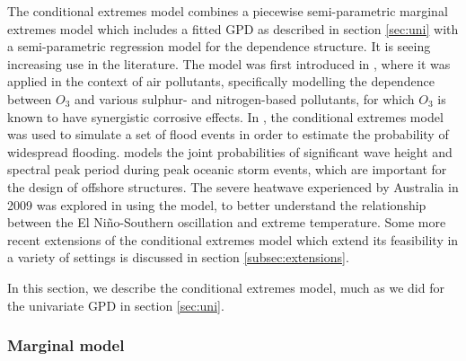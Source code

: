 \documentclass{article}
\numberwithin{equation}{section}
\begin{document}
The conditional extremes model combines a piecewise semi-parametric marginal extremes model which includes a fitted GPD as described in section \ref{sec:uni} with a semi-parametric regression model for the dependence structure. 
It is seeing increasing use in the literature.
The model was first introduced in \citep{Heffernan2004}, where it was applied in the context of air pollutants, specifically modelling the dependence between $O_3$ and various sulphur- and nitrogen-based pollutants, for which $O_3$ is known to have synergistic corrosive effects. 
In \citep{Keef2012_flooding}, the conditional extremes model was used to simulate a set of flood events in order to estimate the probability of widespread flooding. 
\citep{Jonathan2013} models the joint probabilities of significant wave height and spectral peak period during peak oceanic storm events, which are important for the design of offshore structures. 
The severe heatwave experienced by Australia in 2009 was explored in \citep{Winter2016} using the model, to better understand the relationship between the El Niño-Southern oscillation and extreme temperature.
Some more recent extensions of the conditional extremes model which extend its feasibility in a variety of settings is discussed in section \ref{subsec:extensions}.

In this section, we describe the conditional extremes model, much as we did for the univariate GPD in section \ref{sec:uni}.

\subsubsection{Marginal model}
\end{document}
